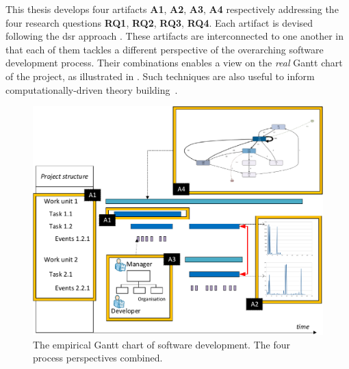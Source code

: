 %
%

This thesis develops four artifacts \textbf{A1}, \textbf{A2}, \textbf{A3}, \textbf{A4} respectively addressing the four research questions \textbf{RQ1}, \textbf{RQ2}, \textbf{RQ3}, \textbf{RQ4}. Each artifact is devised following the \gls{dsr} approach \citep{DBLP:books/sp/Wieringa14}. These artifacts are interconnected to one another in that each of them tackles a different perspective of the overarching software development process. Their combinations enables a view on the \emph{real} Gantt chart of the project, as illustrated in . Such techniques are also useful to inform computationally-driven theory building~\citep{DBLP:journals/isr/BerenteSS19}.

\begin{figure}[]
	\centering
	\includegraphics[width=\linewidth]{figures/big-solution2-crop.pdf}
	\caption{The empirical Gantt chart of software development. The four process perspectives combined.}
	\label{fig:big-solution}
\end{figure}

